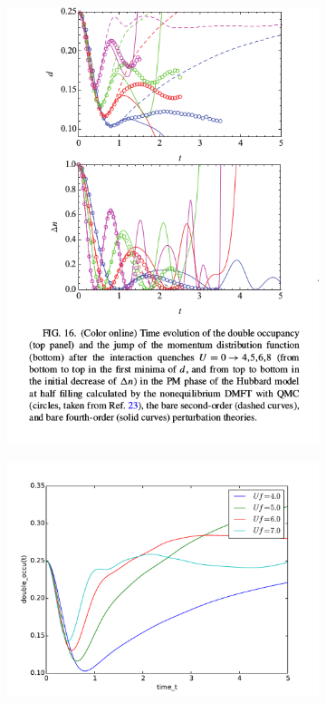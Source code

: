 \begin{figure}[H]
\begin{subfigure}{.5\textwidth}
 \includegraphics[width=1.1\linewidth]{bench_marking/HUB_para_quench_literature_large_U.png}
  \caption{}
\end{subfigure}%
\begin{subfigure}{.5\textwidth}
  \includegraphics[width=1.1\linewidth]{bench_marking/HUB_para_quench_code_large_U.pdf}
  \caption{}
\end{subfigure}
\end{figure}
